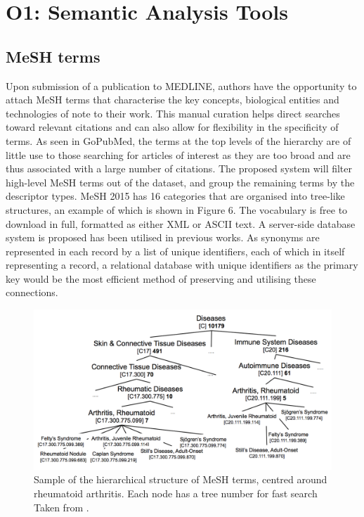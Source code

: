 \documentclass[PROP_AGutteridge_CS.tex]{subfiles}
\begin{document}
\section{O1: Semantic Analysis Tools}
\subsection{MeSH terms}
Upon submission of a publication to MEDLINE, authors have the opportunity to attach MeSH terms that characterise the key concepts, biological entities and technologies of note to their work. This manual curation helps direct searches toward relevant citations and can also allow for flexibility in the specificity of terms. As seen in GoPubMed, the terms at the top levels of the hierarchy are of little use to those searching for articles of interest as they are too broad and are thus associated with a large number of citations. The proposed system will filter high-level MeSH terms out of the dataset, and group the remaining terms by the descriptor types. MeSH 2015 has 16 categories\cite{mesh2015} that are organised into tree-like structures, an example of which is shown in Figure 6. The vocabulary is free to download in full, formatted as either XML or ASCII text. A server-side database system is proposed has been utilised in previous works\cite{stoyanovich}. As synonyms are represented in each record by a list of unique identifiers, each of which in itself representing a record, a relational database with unique identifiers as the primary key would be the most efficient method of preserving and utilising these connections. 

\begin{figure}[ht]
	\includegraphics[width=\textwidth]{../lib/images/MeSH}
	\caption{Sample of the hierarchical structure of MeSH terms, centred around rheumatoid arthritis. Each node has a tree number for fast search Taken from \cite{stoyanovich}.}
\end{figure}
	
\end{document}
